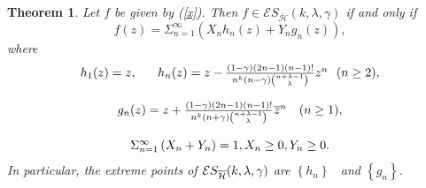 \documentclass[12pt,reqno]{amsart}
\newtheorem{theorem}{Theorem}
\begin{document}
\begin{theorem}
Let $f$ be given by (\ref{x}). Then $f\in \mathcal{E}S_{\overline{\mathcal{H}%
}}(k,\lambda ,\gamma )$ if and only if
\begin{equation*}
f(z)=\Sigma_{n=1}^{\infty}\left(
X_{n}h_{n}(z)+Y_{n}g_{n}(z)\right) ,
\end{equation*}
where
\begin{equation*}
\begin{array}{c}
h_{1}(z)=z,\ \ \ \ \ h_{n}(z)=z-\frac{(1-\gamma )(2n-1)(n-1)!}{%
n^{k}(n-\gamma )\binom{n+\lambda -1}{\lambda }}z^{n}\ \ (n\geq 2), \\ 
\\ 
g_{n}(z)=z+\frac{(1-\gamma )(2n-1)(n-1)!}{n^{k}(n+\gamma )\binom{n+\lambda -1%
}{\lambda }}\overline{z}^{n}\ \ \ (n\geq 1), \\ 
\\ 
\Sigma_{n=1}^{\infty}\left( X_{n}+Y_{n}\right)
=1,X_{n}\geq 0,Y_{n}\geq 0.%
\end{array}%
\end{equation*}
In particular, the extreme points of $\mathcal{E}S_{\overline{%
\mathcal{H}}}(k,\lambda ,\gamma )$ \textit{are }$\left\{ h_{n}\right\} $%
\textit{\ and }$\left\{ g_{n}\right\} $\textit{.}
\end{theorem}
\end{document}
